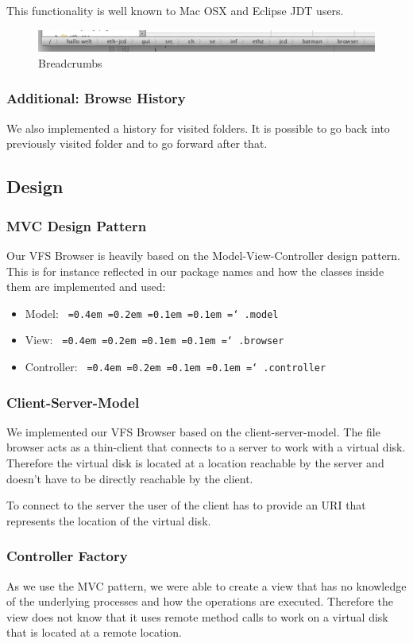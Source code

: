 \documentclass[a4paper,12pt]{article}
\newcommand*\justify{%
  \fontdimen2\font=0.4em%
  \fontdimen3\font=0.2em%
  \fontdimen4\font=0.1em%
  \fontdimen7\font=0.1em%
  \hyphenchar\font=`\-%
}
\newcommand{\mono}[1]{\texttt{\justify #1}}
\begin{document}
This functionality is well known to Mac OSX and Eclipse JDT users.

\begin{figure}[h]
    \includegraphics[width=\textwidth]{screen3.png}
    \caption{Breadcrumbs}
\end{figure}

\subsubsection{Additional: Browse History}
We also implemented a history for visited folders. It is possible to go back into previously visited folder and to go forward after that.

\subsection{Design}

\subsubsection{MVC Design Pattern}
Our VFS Browser is heavily based on the Model-View-Controller design pattern. This is for instance reflected in our package names and how the classes inside them are implemented and used:
\begin{itemize}
    \item Model: \mono{.model}
    \item View: \mono{.browser}
    \item Controller: \mono{.controller}
\end{itemize}

\subsubsection{Client-Server-Model}
We implemented our VFS Browser based on the client-server-model. The file browser acts as a thin-client that connects to a server to work with a virtual disk. Therefore the virtual disk is located at a location reachable by the server and doesn't have to be directly reachable by the client.

To connect to the server the user of the client has to provide an URI that represents the location of the virtual disk.

\subsubsection{Controller Factory}
As we use the MVC pattern, we were able to create a view that has no knowledge of the underlying processes and how the operations are executed. Therefore the view does not know that it uses remote method calls to work on a virtual disk that is located at a remote location.
\end{document}
